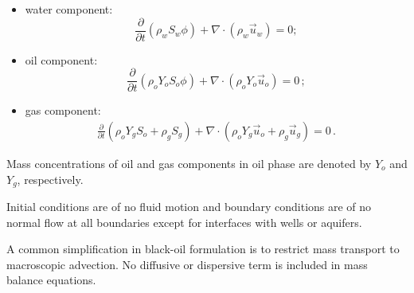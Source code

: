 \documentclass[final,authoryear,5p,times,twocolumn,10pt]{elsarticle}
\begin{document}
\begin{itemize}
\item water component:
\begin{equation}\label{eq: Sw1}
\frac{\partial}{\partial t} \left( \rho_w S_w \phi \right) +\nabla \cdot \left( \rho_w \vec{u}_w \right) = 0 ;
\end{equation}

\item oil component:
\begin{equation}\label{eq: So1}
\frac{\partial}{\partial t}\left( \rho_o Y_o S_o \phi \right) + \nabla \cdot \left( \rho_o Y_o \vec{u}_o \right) = 0 \, ;
\end{equation}

\item gas component:
\begin{equation}\label{eq: Sg1}
\begin{split}
\frac{\partial}{\partial t} \left( \rho_o Y_g S_o + \rho_g S_g\right) + \nabla  \cdot \left( \rho_o Y_g \vec{u}_o + \rho_g \vec{u}_g\right) = 0\, .
\end{split}
\end{equation}
\end{itemize}
Mass concentrations of oil and gas components in oil phase are denoted by $Y_o$ and $Y_g$, respectively. 

Initial conditions are of no fluid motion and boundary conditions are of no normal flow at all boundaries except for interfaces with wells or aquifers.

A common simplification in black-oil formulation is to restrict mass transport to macroscopic advection. No diffusive or dispersive term is included in mass balance equations. 


\end{document}
